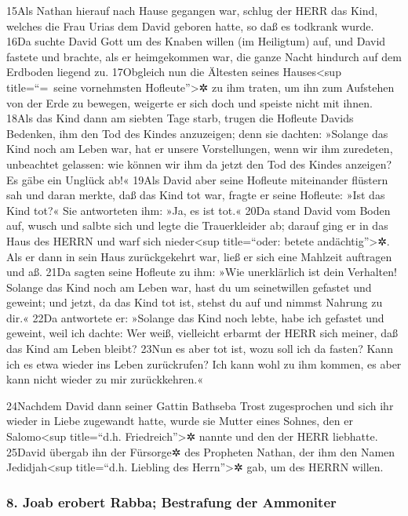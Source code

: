 15Als Nathan hierauf nach Hause gegangen war, schlug der HERR das Kind,
welches die Frau Urias dem David geboren hatte, so daß es todkrank
wurde. 16Da suchte David Gott um des Knaben willen (im Heiligtum) auf,
und David fastete und brachte, als er heimgekommen war, die ganze Nacht
hindurch auf dem Erdboden liegend zu. 17Obgleich nun die Ältesten seines
Hauses\textless sup title=``=~seine vornehmsten Hofleute''\textgreater✲
zu ihm traten, um ihn zum Aufstehen von der Erde zu bewegen, weigerte er
sich doch und speiste nicht mit ihnen. 18Als das Kind dann am siebten
Tage starb, trugen die Hofleute Davids Bedenken, ihm den Tod des Kindes
anzuzeigen; denn sie dachten: »Solange das Kind noch am Leben war, hat
er unsere Vorstellungen, wenn wir ihm zuredeten, unbeachtet gelassen:
wie können wir ihm da jetzt den Tod des Kindes anzeigen? Es gäbe ein
Unglück ab!« 19Als David aber seine Hofleute miteinander flüstern sah
und daran merkte, daß das Kind tot war, fragte er seine Hofleute: »Ist
das Kind tot?« Sie antworteten ihm: »Ja, es ist tot.« 20Da stand David
vom Boden auf, wusch und salbte sich und legte die Trauerkleider ab;
darauf ging er in das Haus des HERRN und warf sich nieder\textless sup
title=``oder: betete andächtig''\textgreater✲. Als er dann in sein Haus
zurückgekehrt war, ließ er sich eine Mahlzeit auftragen und aß. 21Da
sagten seine Hofleute zu ihm: »Wie unerklärlich ist dein Verhalten!
Solange das Kind noch am Leben war, hast du um seinetwillen gefastet und
geweint; und jetzt, da das Kind tot ist, stehst du auf und nimmst
Nahrung zu dir.« 22Da antwortete er: »Solange das Kind noch lebte, habe
ich gefastet und geweint, weil ich dachte: Wer weiß, vielleicht erbarmt
der HERR sich meiner, daß das Kind am Leben bleibt? 23Nun es aber tot
ist, wozu soll ich da fasten? Kann ich es etwa wieder ins Leben
zurückrufen? Ich kann wohl zu ihm kommen, es aber kann nicht wieder zu
mir zurückkehren.«

24Nachdem David dann seiner Gattin Bathseba Trost zugesprochen und sich
ihr wieder in Liebe zugewandt hatte, wurde sie Mutter eines Sohnes, den
er Salomo\textless sup title=``d.h. Friedreich''\textgreater✲ nannte und
den der HERR liebhatte. 25David übergab ihn der Fürsorge✲ des Propheten
Nathan, der ihm den Namen Jedidjah\textless sup title=``d.h. Liebling
des Herrn''\textgreater✲ gab, um des HERRN willen.

\hypertarget{joab-erobert-rabba-bestrafung-der-ammoniter}{%
\subsubsection{8. Joab erobert Rabba; Bestrafung der
Ammoniter}\label{joab-erobert-rabba-bestrafung-der-ammoniter}}

